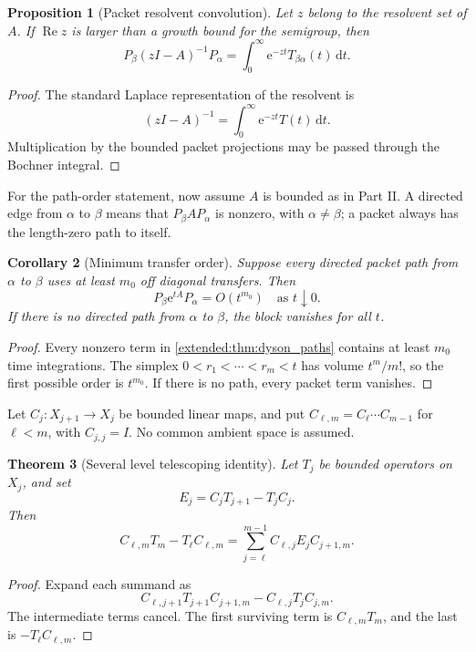 \documentclass[11pt,a4paper]{article}
\newtheorem{theorem}{Theorem}[section]
\newtheorem{proposition}[theorem]{Proposition}
\newtheorem{corollary}[theorem]{Corollary}
\theoremstyle{definition}
\theoremstyle{remark}
\newcommand{\e}{\mathrm e}
\newcommand{\dd}{\,\mathrm d}
\begin{document}
\begin{proposition}[Packet resolvent convolution]\label{earlier:record:002}\label{earlier:prop:packet_resolvent}
Let \(z\) belong to the resolvent set of \(A\). If \(\operatorname{Re}z\) is larger than a growth bound for the semigroup, then
\[
P_\beta(zI-A)^{-1}P_\alpha
=
\int_0^{\infty}\e^{-zt}T_{\beta\alpha}(t)\dd t.
\]
\end{proposition}

\begin{proof}
The standard Laplace representation of the resolvent is
\[
(zI-A)^{-1}
=
\int_0^{\infty}\e^{-zt}T(t)\dd t.
\]
Multiplication by the bounded packet projections may be passed through the Bochner integral.
\end{proof}


For the path-order statement, now assume $A$ is bounded as in Part II. A directed edge from $\alpha$ to $\beta$ means that $P_\beta A P_\alpha$ is nonzero, with $\alpha\ne\beta$; a packet always has the length-zero path to itself.
\begin{corollary}[Minimum transfer order]\label{earlier:record:003}\label{earlier:cor:minimum_transfer_order}
Suppose every directed packet path from \(\alpha\) to \(\beta\) uses at least \(m_0\) off diagonal transfers. Then
\[
P_\beta\e^{tA}P_\alpha
=O(t^{m_0})
\quad\text{as }t\downarrow0.
\]
If there is no directed path from \(\alpha\) to \(\beta\), the block vanishes for all \(t\).
\end{corollary}

\begin{proof}
Every nonzero term in \cref{extended:thm:dyson_paths} contains at least \(m_0\) time integrations. The simplex \(0<r_1<\cdots<r_m<t\) has volume \(t^m/m!\), so the first possible order is \(t^{m_0}\). If there is no path, every packet term vanishes.
\end{proof}


Let $C_j:X_{j+1}\to X_j$ be bounded linear maps, and put $C_{\ell,m}=C_\ell\cdots C_{m-1}$ for $\ell<m$, with $C_{j,j}=I$. No common ambient space is assumed.
\begin{theorem}[Several level telescoping identity]\label{earlier:record:004}\label{earlier:thm:multilevel_telescoping}
Let \(T_j\) be bounded operators on \(X_j\), and set
\[
E_j=C_jT_{j+1}-T_jC_j.
\]
Then
\[
\boxed{
C_{\ell,m}T_m-T_\ell C_{\ell,m}
=
\sum_{j=\ell}^{m-1}
C_{\ell,j}E_jC_{j+1,m}.
}
\]
\end{theorem}

\begin{proof}
Expand each summand as
\[
C_{\ell,j+1}T_{j+1}C_{j+1,m}
-
C_{\ell,j}T_jC_{j,m}.
\]
The intermediate terms cancel. The first surviving term is \(C_{\ell,m}T_m\), and the last is \(-T_\ell C_{\ell,m}\).
\end{proof}
\end{document}
